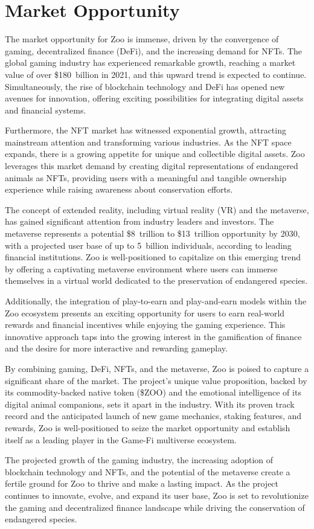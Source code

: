 \section{Market Opportunity}

The market opportunity for Zoo is immense, driven by the convergence of gaming, decentralized finance (DeFi), and the increasing demand for NFTs. The global gaming industry has experienced remarkable growth, reaching a market value of over \$180~billion in 2021, and this upward trend is expected to continue. Simultaneously, the rise of blockchain technology and DeFi has opened new avenues for innovation, offering exciting possibilities for integrating digital assets and financial systems.

Furthermore, the NFT market has witnessed exponential growth, attracting mainstream attention and transforming various industries. As the NFT space expands, there is a growing appetite for unique and collectible digital assets. Zoo leverages this market demand by creating digital representations of endangered animals as NFTs, providing users with a meaningful and tangible ownership experience while raising awareness about conservation efforts.

The concept of extended reality, including virtual reality (VR) and the metaverse, has gained significant attention from industry leaders and investors. The metaverse represents a potential \$8~trillion to \$13~trillion opportunity by 2030, with a projected user base of up to 5~billion individuals, according to leading financial institutions. Zoo is well-positioned to capitalize on this emerging trend by offering a captivating metaverse environment where users can immerse themselves in a virtual world dedicated to the preservation of endangered species.

Additionally, the integration of play-to-earn and play-and-earn models within the Zoo ecosystem presents an exciting opportunity for users to earn real-world rewards and financial incentives while enjoying the gaming experience. This innovative approach taps into the growing interest in the gamification of finance and the desire for more interactive and rewarding gameplay.

By combining gaming, DeFi, NFTs, and the metaverse, Zoo is poised to capture a significant share of the market. The project's unique value proposition, backed by its commodity-backed native token (\$ZOO) and the emotional intelligence of its digital animal companions, sets it apart in the industry. With its proven track record and the anticipated launch of new game mechanics, staking features, and \DAO{} rewards, Zoo is well-positioned to seize the market opportunity and establish itself as a leading player in the Game-Fi multiverse ecosystem.

The projected growth of the gaming industry, the increasing adoption of blockchain technology and NFTs, and the potential of the metaverse create a fertile ground for Zoo to thrive and make a lasting impact. As the project continues to innovate, evolve, and expand its user base, Zoo is set to revolutionize the gaming and decentralized finance landscape while driving the conservation of endangered species.
